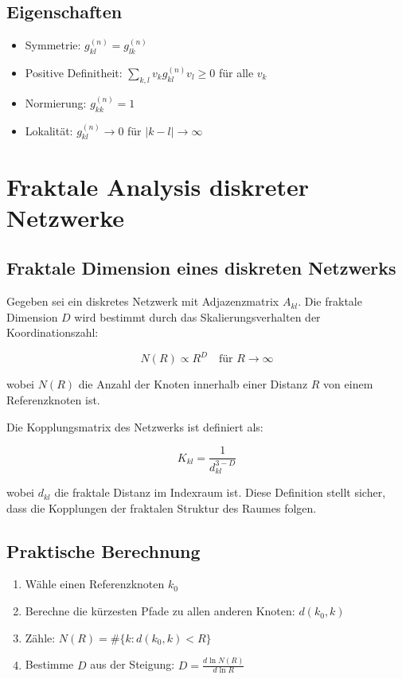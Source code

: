 \subsection{Eigenschaften}
\label{sub:mathematik_metrik_eigenschaften}

\begin{itemize}
    \item Symmetrie: \( g_{kl}^{(n)} = g_{lk}^{(n)} \)
    \item Positive Definitheit: \( \sum_{k,l} v_k g_{kl}^{(n)} v_l \geq 0 \) für alle \( v_k \)
    \item Normierung: \( g_{kk}^{(n)} = 1 \)
    \item Lokalität: \( g_{kl}^{(n)} \to 0 \) für \( |k-l| \to \infty \)
\end{itemize}

\section{Fraktale Analysis diskreter Netzwerke}
\label{app:mathematik_fraktal}

\subsection{Fraktale Dimension eines diskreten Netzwerks}
\label{sub:mathematik_fraktale_dim}

Gegeben sei ein diskretes Netzwerk mit Adjazenzmatrix \( A_{kl} \). Die fraktale Dimension \( D \) wird bestimmt durch das Skalierungsverhalten der Koordinationszahl:

\[
N(R) \propto R^D \quad \text{für } R \to \infty
\]

wobei \( N(R) \) die Anzahl der Knoten innerhalb einer Distanz \( R \) von einem Referenzknoten ist.

Die Kopplungsmatrix des Netzwerks ist definiert als:

\[
K_{kl} = \frac{1}{d_{kl}^{3-D}}
\]

wobei \( d_{kl} \) die fraktale Distanz im Indexraum ist. Diese Definition stellt sicher, dass die Kopplungen der fraktalen Struktur des Raumes folgen.

\subsection{Praktische Berechnung}
\label{sub:mathematik_fraktale_berechnung}

\begin{enumerate}
    \item Wähle einen Referenzknoten \( k_0 \)
    \item Berechne die kürzesten Pfade zu allen anderen Knoten: \( d(k_0, k) \)
    \item Zähle: \( N(R) = \#\{k : d(k_0, k) < R\} \)
    \item Bestimme \( D \) aus der Steigung: \( D = \frac{d \ln N(R)}{d \ln R} \)
\end{enumerate}

